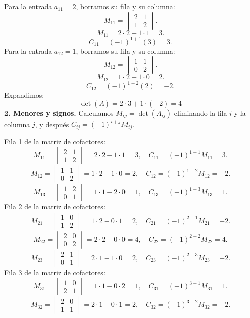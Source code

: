 \documentclass[12pt]{article}
\theoremstyle{remark}
\begin{document}
Para la entrada $a_{11}=2$, borramos su fila y su columna:
\[
M_{11}=\begin{vmatrix}2&1\\1&2\end{vmatrix}.
\]
\[
M_{11}=2\cdot 2-1\cdot 1=3.
\]
\[
C_{11}=(-1)^{1+1}(3)=3.
\]
Para la entrada $a_{12}=1$, borramos su fila y su columna:
\[
M_{12}=\begin{vmatrix}1&1\\0&2\end{vmatrix}.
\]
\[
M_{12}=1\cdot 2-1\cdot 0=2.
\]
\[
C_{12}=(-1)^{1+2}(2)=-2.
\]
Expandimos: \[
\boxed{\det(A)=2\cdot 3 + 1\cdot (-2)=4}
\]
\textbf{2. Menores y signos.} Calculamos $M_{ij}=\det(A_{ij})$ eliminando la fila $i$ y la columna $j$, y después $C_{ij}=(-1)^{i+j}M_{ij}$.

Fila 1 de la matriz de cofactores:
\[
M_{11}=\begin{vmatrix}2&1\\1&2\end{vmatrix}=2\cdot 2-1\cdot 1=3,\quad C_{11}=(-1)^{1+1}M_{11}=3.
\]
\[
M_{12}=\begin{vmatrix}1&1\\0&2\end{vmatrix}=1\cdot 2-1\cdot 0=2,\quad C_{12}=(-1)^{1+2}M_{12}=-2.
\]
\[
M_{13}=\begin{vmatrix}1&2\\0&1\end{vmatrix}=1\cdot 1-2\cdot 0=1,\quad C_{13}=(-1)^{1+3}M_{13}=1.
\]
Fila 2 de la matriz de cofactores:
\[
M_{21}=\begin{vmatrix}1&0\\1&2\end{vmatrix}=1\cdot 2-0\cdot 1=2,\quad C_{21}=(-1)^{2+1}M_{21}=-2.
\]
\[
M_{22}=\begin{vmatrix}2&0\\0&2\end{vmatrix}=2\cdot 2-0\cdot 0=4,\quad C_{22}=(-1)^{2+2}M_{22}=4.
\]
\[
M_{23}=\begin{vmatrix}2&1\\0&1\end{vmatrix}=2\cdot 1-1\cdot 0=2,\quad C_{23}=(-1)^{2+3}M_{23}=-2.
\]
Fila 3 de la matriz de cofactores:
\[
M_{31}=\begin{vmatrix}1&0\\2&1\end{vmatrix}=1\cdot 1-0\cdot 2=1,\quad C_{31}=(-1)^{3+1}M_{31}=1.
\]
\[
M_{32}=\begin{vmatrix}2&0\\1&1\end{vmatrix}=2\cdot 1-0\cdot 1=2,\quad C_{32}=(-1)^{3+2}M_{32}=-2.
\]
\end{document}
